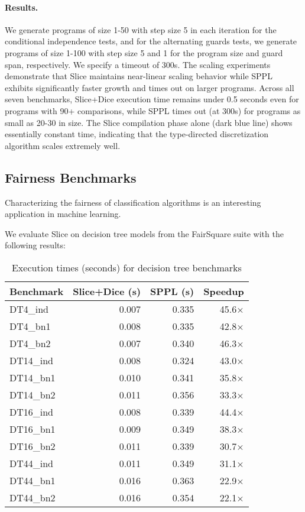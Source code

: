 

\paragraph{Results.} We generate programs of size 1-50 with step size 5 in each iteration for the conditional independence tests, and for the alternating guards tests, we generate programs of size 1-100 with step size 5 and 1 for the program size and guard span, respectively. We specify a timeout of 300s. The scaling experiments demonstrate that Slice maintains near-linear scaling behavior while SPPL exhibits significantly faster growth and times out on larger programs. Across all seven benchmarks, Slice+Dice execution time remains under 0.5 seconds even for programs with 90+ comparisons, while SPPL times out (at 300s) for programs as small as 20-30 in size. The Slice compilation phase alone (dark blue line) shows essentially constant time, indicating that the type-directed discretization algorithm scales extremely well.

\subsection{Fairness Benchmarks}
Characterizing the fairness of classification algorithms is an interesting application in machine learning. 


We evaluate Slice on decision tree models from the FairSquare suite with the following results:

\begin{table}[!t]
\centering
\begin{tabular}{lrrr}
\toprule
Benchmark & Slice+Dice (s) & SPPL (s) & Speedup \\
\midrule
DT4\_ind & 0.007 & 0.335 & 45.6× \\
DT4\_bn1 & 0.008 & 0.335 & 42.8× \\
DT4\_bn2 & 0.007 & 0.340 & 46.3× \\
DT14\_ind & 0.008 & 0.324 & 43.0× \\
DT14\_bn1 & 0.010 & 0.341 & 35.8× \\
DT14\_bn2 & 0.011 & 0.356 & 33.3× \\
DT16\_ind & 0.008 & 0.339 & 44.4× \\
DT16\_bn1 & 0.009 & 0.349 & 38.3× \\
DT16\_bn2 & 0.011 & 0.339 & 30.7× \\
DT44\_ind & 0.011 & 0.349 & 31.1× \\
DT44\_bn1 & 0.016 & 0.363 & 22.9× \\
DT44\_bn2 & 0.016 & 0.354 & 22.1× \\
\bottomrule
\end{tabular}
\caption{Execution times (seconds) for decision tree benchmarks}
\end{table}

